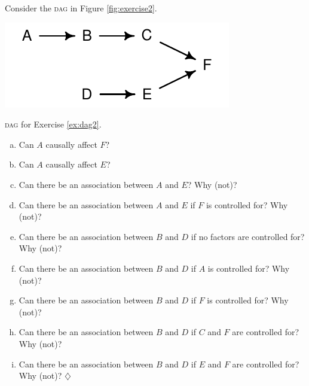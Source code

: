 \documentclass[a4paper]{tufte-book}\usepackage[]{graphicx}\usepackage[]{xcolor}
\newcommand*{\parend}[1][$\diamondsuit$]{%
\leavevmode\unskip\penalty9999 \hbox{}\nobreak\hfill
    \quad\hbox{#1}%
}
\begin{document}
Consider the \textsc{dag} in Figure \ref{fig:exercise2}.\label{ex:dag2}
\begin{marginfigure}[3cm]
\includegraphics[width=\textwidth]{figure/exercise2}
\caption{\textsc{dag} for Exercise \ref{ex:dag2}.}
\label{fig:exercise2}
\end{marginfigure}
  \begin{enumerate}[(a)]
    \item Can $A$ causally affect $F$?
    \item Can $A$ causally affect $E$?
    \item Can there be an association between $A$ and $E$?
    Why (not)?
    \item Can there be an association between $A$ and $E$
    if $F$ is controlled for? Why (not)?
    \item Can there be an association between $B$ and $D$
    if no factors are controlled for? Why (not)?
    \item Can there be an association between $B$ and $D$
    if $A$ is controlled for? Why (not)?
    \item Can there be an association between $B$ and $D$
    if $F$ is controlled for? Why (not)?
    \item Can there be an association between $B$ and $D$
    if $C$ and $F$ are controlled for? Why (not)?
    \item Can there be an association between $B$ and $D$
    if $E$ and $F$ are controlled for? Why (not)? \parend
  \end{enumerate}
\end{document}
